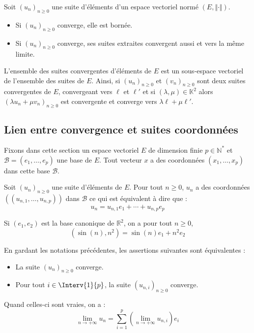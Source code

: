 \documentclass[a4paper,10pt]{report}
\begin{document}
\begin{Proposition}{} Soit $(u_n)_{n \geq 0}$ une suite d'éléments d'un espace vectoriel normé $(E, \Vert \cdot \Vert)$.

\begin{itemize}
\item Si $(u_n)_{n \geq 0}$ converge, elle est bornée.
\item Si $(u_n)_{n \geq 0}$ converge, ses suites extraites convergent aussi et vers la même limite.
\end{itemize}
\end{Proposition}

\begin{Proposition}{} L'ensemble des suites convergentes d'éléments de $E$ est un sous-espace vectoriel de l'ensemble des suites de $E$. Ainsi, si $(u_n)_{n \geq 0}$ et $(v_n)_{n \geq 0}$ sont deux suites convergentes de $E$, convergeant vers $\ell$ et $\ell'$ et si $(\lambda, \mu) \in \mathbb{K}^2$ alors $(\lambda u_n + \mu v_n)_{n \geq 0}$ est convergente et converge vers $\lambda \ell + \mu \ell'$.
\end{Proposition}


\subsection{Lien entre convergence et suites coordonnées}

Fixons dans cette section un espace vectoriel $E$ de dimension finie $p \in \mathbb{N}^*$ et $\mathcal{B} = (e_1, \ldots, e_p)$ une base de $E$. Tout vecteur $x$ a des coordonnées $(x_1, \ldots, x_p)$ dans cette base $\mathcal{B}$. 

Soit $(u_n)_{n \geq 0}$ une suite d'éléments de $E$. Pour tout $n \geq 0$, $u_n$ a des coordonnées $((u_{n,1}, \ldots, u_{n,p}))$ dans $\mathcal{B}$ ce qui est équivalent à dire que :
$$ u_n = u_{n,1} e_1 + \cdots + u_{n,p} e_p $$

\begin{Exemple} Si $(e_1,e_2)$ est la base canonique de $\mathbb{R}^2$, on a pour tout $n \geq 0$,
$$ (\sin(n),n^2) = \sin(n) e_1 + n^2e_2$$
\end{Exemple}

\begin{Theoreme}{} En gardant les notations précédentes, les assertions suivantes sont équivalentes :
\begin{itemize}
\item La suite $(u_n)_{n \geq 0}$ converge.
\item Pour tout $i \in \Interv{1}{p}$, la suite $(u_{n,i})_{n \geq 0}$ converge.
\end{itemize}
Quand celles-ci sont vraies, on a :
$$ \lim_{n \rightarrow + \infty} u_n = \sum_{i=1}^p \left(\lim_{n \rightarrow + \infty} u_{n,i} \right) e_i $$
\end{Theoreme}
\end{document}
